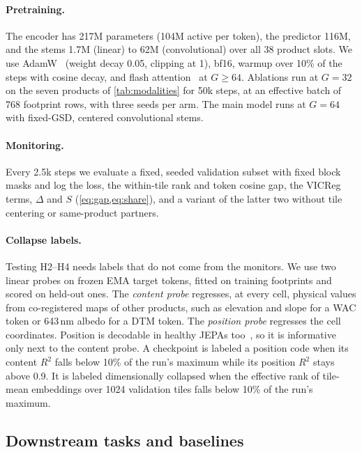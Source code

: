 \paragraph{Pretraining.} The encoder has 217M parameters (104M active per token), the predictor 116M, and the stems 1.7M (linear) to 62M (convolutional) over all 38 product slots. We use AdamW~\cite{loshchilov2019decoupled} (weight decay 0.05, clipping at 1), bf16, warmup over 10\% of the steps with cosine decay, and flash attention~\cite{dao2022flashattention} at $G{\geq}64$. Ablations run at $G{=}32$ on the seven products of \cref{tab:modalities} for 50k steps, at an effective batch of 768 footprint rows, with three seeds per arm. The main model runs at $G{=}64$ with fixed-GSD, centered convolutional stems. 

\paragraph{Monitoring.} Every 2.5k steps we evaluate a fixed, seeded validation subset with fixed block masks and log the loss, the within-tile rank and token cosine gap, the VICReg terms, $\Delta$ and $S$ (\cref{eq:gap,eq:share}), and a variant of the latter two without tile centering or same-product partners.

\paragraph{Collapse labels.}
\label{sec:ground_truth}
Testing H2--H4 needs labels that do not come from the monitors. We use two linear probes on frozen EMA target tokens, fitted on training footprints and scored on held-out ones. The \emph{content probe} regresses, at every cell, physical values from co-registered maps of other products, such as elevation and slope for a WAC token or 643\,nm albedo for a DTM token. The \emph{position probe} regresses the cell coordinates. Position is decodable in healthy JEPAs too~\cite{yamada2026siamjepa}, so it is informative only next to the content probe. A checkpoint is labeled a position code when its content $R^2$ falls below 10\% of the run's maximum while its position $R^2$ stays above 0.9. It is labeled dimensionally collapsed when the effective rank of tile-mean embeddings over 1024 validation tiles falls below 10\% of the run's maximum. 

\subsection{Downstream tasks and baselines}
\label{sec:downstream_protocol}


